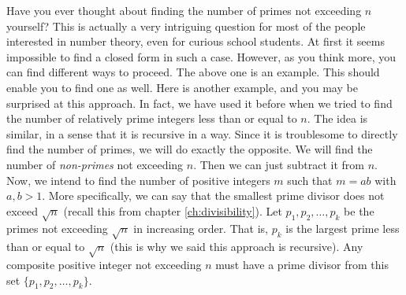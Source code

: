 \documentclass{subfiles}
\begin{document}
		Have you ever thought about finding the number of primes not exceeding $n$ yourself? This is actually a very intriguing question for most of the people interested in number theory, even for curious school students. At first it seems impossible to find a closed form in such a case. However, as you think more, you can find different ways to proceed. The above one is an example. This should enable you to find one as well. Here is another example, and you may be surprised at this approach. In fact, we have used it before when we tried to find the number of relatively prime integers less than or equal to $n$. The idea is similar, in a sense that it is recursive in a way. Since it is troublesome to directly find the number of primes, we will do exactly the opposite. We will find the number of \textit{non-primes} not exceeding $n$. Then we can just subtract it from $n$. Now, we intend to find the number of positive integers $m$ such that $m=ab$ with $a,b>1$. More specifically, we can say that the smallest prime divisor does not exceed $\sqrt{n}$ (recall this from chapter \eqref{ch:divisibility}). Let $p_1,p_2,\ldots,p_k$ be the primes not exceeding $\sqrt{n}$ in increasing order. That is, $p_k$ is the largest prime less than or equal to $\sqrt{n}$ (this is why we said this approach is recursive). Any composite positive integer not exceeding $n$ must have a prime divisor from this set $\{p_1,p_2,\ldots,p_k\}$.
\end{document}
